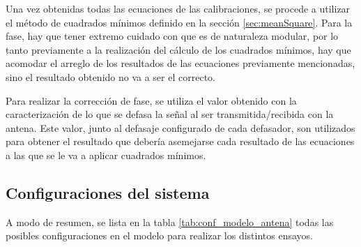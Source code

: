 Una vez obtenidas todas las ecuaciones de las calibraciones, se procede a utilizar el método de cuadrados mínimos definido en 
la sección \ref{sec:meanSquare}. Para la fase, hay que tener extremo cuidado con que es de naturaleza modular, por lo tanto 
previamente a la realización del cálculo de los cuadrados mínimos, hay que acomodar el arreglo de los resultados de las 
ecuaciones previamente mencionadas, sino el resultado obtenido no va a ser el correcto.

Para realizar la corrección de fase, se utiliza el valor obtenido con la caracterización de lo que se defasa la señal al ser 
transmitida/recibida con la antena. Este valor, junto al defasaje configurado de cada defasador, son utilizados para obtener el
resultado que debería asemejarse cada resultado de las ecuaciones a las que se le va a aplicar cuadrados mínimos. 

\subsection{Configuraciones del sistema}

A modo de resumen, se lista en la tabla \ref{tab:conf_modelo_antena} todas las posibles configuraciones en el modelo para 
realizar los distintos ensayos.

